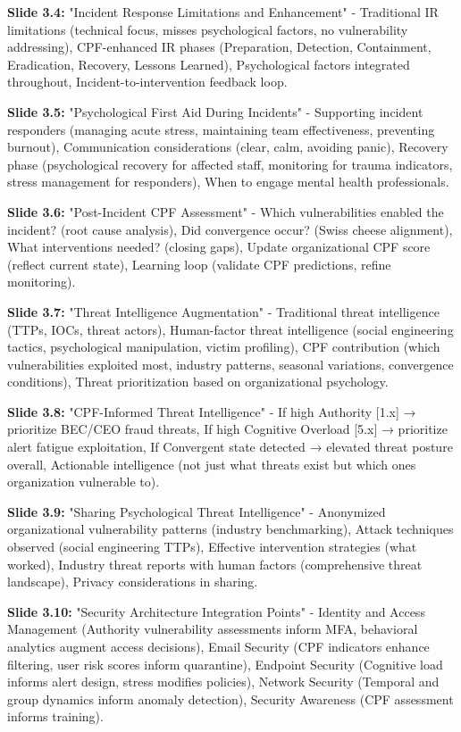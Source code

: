 \documentclass[11pt,a4paper]{article}
\begin{document}
\textbf{Slide 3.4:} "Incident Response Limitations and Enhancement" - Traditional IR limitations (technical focus, misses psychological factors, no vulnerability addressing), CPF-enhanced IR phases (Preparation, Detection, Containment, Eradication, Recovery, Lessons Learned), Psychological factors integrated throughout, Incident-to-intervention feedback loop.

\textbf{Slide 3.5:} "Psychological First Aid During Incidents" - Supporting incident responders (managing acute stress, maintaining team effectiveness, preventing burnout), Communication considerations (clear, calm, avoiding panic), Recovery phase (psychological recovery for affected staff, monitoring for trauma indicators, stress management for responders), When to engage mental health professionals.

\textbf{Slide 3.6:} "Post-Incident CPF Assessment" - Which vulnerabilities enabled the incident? (root cause analysis), Did convergence occur? (Swiss cheese alignment), What interventions needed? (closing gaps), Update organizational CPF score (reflect current state), Learning loop (validate CPF predictions, refine monitoring).

\textbf{Slide 3.7:} "Threat Intelligence Augmentation" - Traditional threat intelligence (TTPs, IOCs, threat actors), Human-factor threat intelligence (social engineering tactics, psychological manipulation, victim profiling), CPF contribution (which vulnerabilities exploited most, industry patterns, seasonal variations, convergence conditions), Threat prioritization based on organizational psychology.

\textbf{Slide 3.8:} "CPF-Informed Threat Intelligence" - If high Authority [1.x] → prioritize BEC/CEO fraud threats, If high Cognitive Overload [5.x] → prioritize alert fatigue exploitation, If Convergent state detected → elevated threat posture overall, Actionable intelligence (not just what threats exist but which ones organization vulnerable to).

\textbf{Slide 3.9:} "Sharing Psychological Threat Intelligence" - Anonymized organizational vulnerability patterns (industry benchmarking), Attack techniques observed (social engineering TTPs), Effective intervention strategies (what worked), Industry threat reports with human factors (comprehensive threat landscape), Privacy considerations in sharing.

\textbf{Slide 3.10:} "Security Architecture Integration Points" - Identity and Access Management (Authority vulnerability assessments inform MFA, behavioral analytics augment access decisions), Email Security (CPF indicators enhance filtering, user risk scores inform quarantine), Endpoint Security (Cognitive load informs alert design, stress modifies policies), Network Security (Temporal and group dynamics inform anomaly detection), Security Awareness (CPF assessment informs training).
\end{document}
